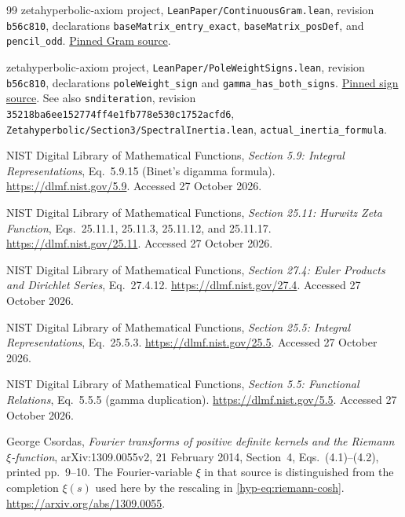 \documentclass[11pt,a4paper]{article}
\numberwithin{equation}{section}
\theoremstyle{definition}
\theoremstyle{remark}
\begin{document}
\begin{thebibliography}{99}
zetahyperbolic-axiom project,
\texttt{LeanPaper/ContinuousGram.lean}, revision \texttt{b56c810},
declarations \texttt{baseMatrix\_entry\_exact},
\texttt{baseMatrix\_posDef}, and \texttt{pencil\_odd}.
\href{https://github.com/randogelist/zetahyperbolic-axiom/blob/b56c8102d25b931a601992c93bf30b19cc7ee103/src/LeanPaper/ContinuousGram.lean}{Pinned Gram source}.

zetahyperbolic-axiom project,
\texttt{LeanPaper/PoleWeightSigns.lean}, revision \texttt{b56c810},
declarations \texttt{poleWeight\_sign} and
\texttt{gamma\_has\_both\_signs}.
\href{https://github.com/randogelist/zetahyperbolic-axiom/blob/b56c8102d25b931a601992c93bf30b19cc7ee103/src/LeanPaper/PoleWeightSigns.lean}{Pinned sign source}.
See also \texttt{snditeration}, revision
\texttt{35218ba6ee152774ff4e1fb778e530c1752acfd6},
\texttt{Zetahyperbolic/Section3/SpectralInertia.lean},
\texttt{actual\_inertia\_formula}.

NIST Digital Library of Mathematical Functions,
\emph{Section 5.9: Integral Representations}, Eq.~5.9.15
(Binet's digamma formula).
\url{https://dlmf.nist.gov/5.9}. Accessed 27 October 2026.

NIST Digital Library of Mathematical Functions,
\emph{Section 25.11: Hurwitz Zeta Function},
Eqs.~25.11.1, 25.11.3, 25.11.12, and 25.11.17.
\url{https://dlmf.nist.gov/25.11}. Accessed 27 October 2026.

NIST Digital Library of Mathematical Functions,
\emph{Section 27.4: Euler Products and Dirichlet Series}, Eq.~27.4.12.
\url{https://dlmf.nist.gov/27.4}. Accessed 27 October 2026.

NIST Digital Library of Mathematical Functions,
\emph{Section 25.5: Integral Representations}, Eq.~25.5.3.
\url{https://dlmf.nist.gov/25.5}. Accessed 27 October 2026.

NIST Digital Library of Mathematical Functions,
\emph{Section 5.5: Functional Relations}, Eq.~5.5.5
(gamma duplication).
\url{https://dlmf.nist.gov/5.5}. Accessed 27 October 2026.

George Csordas, \emph{Fourier transforms of positive definite kernels
and the Riemann $\xi$-function}, arXiv:1309.0055v2,
21 February 2014, Section~4, Eqs.~(4.1)--(4.2), printed pp.~9--10.
The Fourier-variable $\xi$ in that source is distinguished from
the completion $\xi(s)$ used here by the rescaling in
\eqref{hyp-eq:riemann-cosh}.
\url{https://arxiv.org/abs/1309.0055}.



\end{thebibliography}
\end{document}
